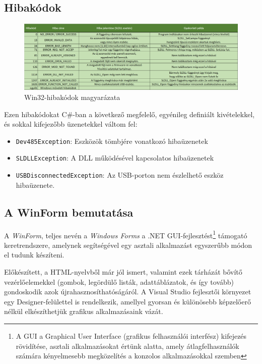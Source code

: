 \documentclass[tocnopagenum]{thesis-ekf}
\theoremstyle{definition}
\theoremstyle{remark}
\begin{document}
	\subsection{Hibakódok}
	\begin{figure}[ht!]
		\hspace*{-1in}
		\includegraphics[scale=0.7]{images/errcodes.png}
		\caption{Win32-hibakódok magyarázata}
		\label{fig:errcodes}
	\end{figure}
	\cite{errcodes}
	Ezen hibakódokat C\#-ban a következő megfelelő, egyénileg definiált kivételekkel, és sokkal kifejezőbb üzenetekkel váltom fel:
	\begin{itemize}
		\item \verb*|Dev485Exception|: Eszközök tömbjére vonatkozó hibaüzenetek
		\item \verb*|SLDLLException|: A DLL működésével kapcsolatos hibaüzenetek
		\item \verb*|USBDisconnectedException|: Az USB-porton nem észlelhető eszköz hibaüzenete.
	\end{itemize}
	\subsection{A WinForm bemutatása}
	A \textit{WinForm}, teljes nevén a \textit{Windows Forms} a .NET GUI-fejlesztést\footnote{A GUI a Graphical User Interface (grafikus felhasználói interfész) kifejezés rövidítése, asztali alkalmazásokat értünk alatta, amely átlagfelhasználók számára kényelmesebb megközelítés a konzolos alkalmazásokkal szemben} támogató keretrendszere, amelynek segítségével egy asztali alkalmazást egyszerűbb módon el tudunk készíteni. 
	
	Előkészített, a HTML-nyelvből már jól ismert, valamint ezek tárházát bővítő vezérlőelemekkel (gombok, legördülő listák, adattáblázatok, és így tovább) gondoskodik azok újrahasznosíthatóságáról. A Visual Studio fejlesztői környezet egy Designer-felülettel is rendelkezik, amellyel gyorsan és különösebb képzelőerő nélkül elkészíthetjük grafikus alkalmazásaink vázát.
	
\end{document}
